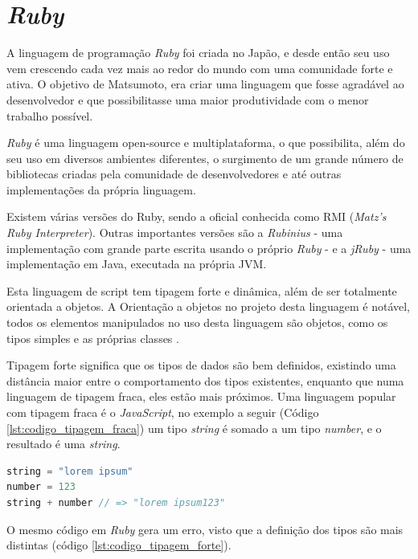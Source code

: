 \section{\textit{Ruby}}

A linguagem de programação \textit{Ruby} \cite{RUBY} foi criada no Japão, e desde então seu uso vem crescendo cada vez mais ao redor do mundo com uma comunidade forte e ativa. O objetivo de Matsumoto, era criar uma linguagem que fosse agradável ao desenvolvedor e que possibilitasse uma maior produtividade com o menor trabalho possível.

\textit{Ruby} é uma linguagem open-source e multiplataforma, o que possibilita, além do seu uso em diversos ambientes diferentes, o surgimento de um grande número de bibliotecas criadas pela comunidade de desenvolvedores e até outras implementações da própria linguagem.

Existem várias versões do Ruby, sendo a oficial conhecida como RMI (\textit{Matz’s Ruby Interpreter}). Outras importantes versões são a \textit{Rubinius} \cite{RUBINIUS} - uma implementação com grande parte escrita usando o próprio \textit{Ruby} -  e a \textit{jRuby} \cite{JRUBY} - uma implementação em Java, executada na própria JVM.

Esta linguagem de script tem tipagem forte e dinâmica, além de ser totalmente orientada a objetos.  A Orientação a objetos no projeto desta linguagem é notável, todos os elementos manipulados no uso desta linguagem são objetos, como os tipos simples e as próprias classes \cite{THOMAS}.

Tipagem forte significa que os tipos de dados são bem definidos, existindo uma distância maior entre o comportamento dos tipos existentes, enquanto que numa linguagem de tipagem fraca, eles estão mais próximos. Uma linguagem popular com tipagem fraca é o \textit{JavaScript}, no exemplo a seguir (Código \ref{lst:codigo_tipagem_fraca}) um tipo \textit{string} é somado a um tipo \textit{number}, e o resultado é uma \textit{string}.

{\singlespace
\begin{lstlisting}[caption=Tipagem fraca no \textit{JavaScript}, language=Java, label={lst:codigo_tipagem_fraca}]
string = "lorem ipsum"
number = 123
string + number // => "lorem ipsum123"
\end{lstlisting}
}

O mesmo código em \textit{Ruby} gera um erro, visto que a definição dos tipos são mais distintas (código \ref{lst:codigo_tipagem_forte}).

